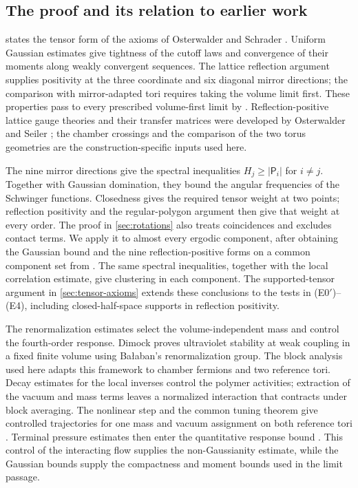 \subsection{The proof and its relation to earlier work}

 states the tensor form of the axioms of
Osterwalder and Schrader \cite{OS1973,OS1975}. Uniform Gaussian
estimates give tightness of the cutoff laws and convergence of their
moments along weakly convergent sequences. The lattice reflection
argument supplies positivity at the
three coordinate and six diagonal mirror directions; the comparison
with mirror-adapted tori requires taking the volume limit first.
These properties pass to every prescribed volume-first limit by
\cite{ChamberLattice,ContinuumLimits}. Reflection-positive lattice
gauge theories and their transfer matrices were developed by
Osterwalder and Seiler \cite{OsterwalderSeiler1978}; the chamber
crossings and the comparison of the two torus geometries are the
construction-specific inputs used here.

The nine mirror directions give the spectral inequalities
$H_j\ge|\mathsf P_i|$ for $i\ne j$. Together with Gaussian
domination, they bound the angular frequencies of the Schwinger
functions. Closedness gives the required tensor weight at two
points; reflection positivity and the regular-polygon argument then
give that weight at every order. The proof in \cref{sec:rotations}
also treats coincidences and excludes contact terms. We apply it
to almost every ergodic component, after obtaining the Gaussian
bound and the nine reflection-positive forms on a common component
set from \cite{ErgodicComponents}. The same spectral inequalities,
together with the local correlation estimate, give clustering in
each component. The supported-tensor argument
in \cref{sec:tensor-axioms} extends these conclusions to the tests
in \textup{(E0$'$)}--\textup{(E4)}, including closed-half-space
supports in reflection positivity.

The renormalization estimates select the volume-independent mass
and control the fourth-order response. Dimock \cite{DimockUVS2022}
proves ultraviolet stability at weak coupling in a fixed finite
volume using Ba{\l}aban's renormalization group. The block analysis
used here adapts this framework to chamber fermions and two
reference tori. Decay estimates for the local inverses control the
polymer activities; extraction of the vacuum and mass terms leaves
a normalized interaction that contracts under block averaging.
The nonlinear step and the common tuning theorem give controlled
trajectories for one mass and vacuum assignment on both reference
tori \cite{NormalizedContraction,NonlinearStep,CoverTuning}.
Terminal pressure estimates then enter the quantitative response
bound \cite{TerminalPressure,ReferenceResponse}. This control of
the interacting flow supplies the non-Gaussianity estimate, while
the Gaussian bounds supply the compactness and moment bounds used
in the limit passage.

